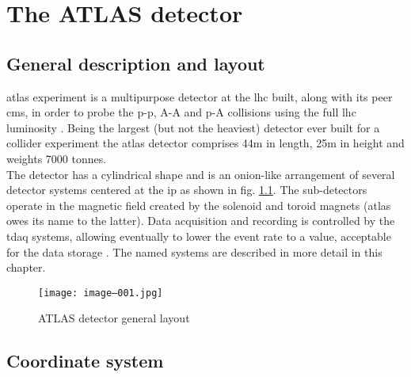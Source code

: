 \chapter{The ATLAS detector}
    
   
        
    \section{General description and layout}
    
        \gls{atlas} experiment is a multipurpose detector at the \gls{lhc} built, along with its peer \gls{cms}, in order to probe the p-p, A-A and p-A collisions using the full \gls{lhc} luminosity \cite{atlas_experiment}. Being the largest (but not the heaviest) detector ever built for a collider experiment the \gls{atlas} detector comprises 44m in length, 25m in height and weights 7000 tonnes. \\
        The detector has a cylindrical shape and is an onion-like arrangement of several detector systems centered at the \gls{ip} as shown in fig. \ref{fig::atlas_layout}. The sub-detectors operate in the magnetic field created by the solenoid and toroid magnets (\gls{atlas} owes its name to the latter). Data acquisition and recording is controlled by the \gls{tdaq} systems, allowing eventually to lower the event rate to a value, acceptable for the data storage \cite{atlas_trigger}. The named systems are described in more detail in this chapter.
        
        
        \begin{figure}[htpb]
        		\texttt{[image: image--001.jpg]}
        		\caption{ ATLAS detector general layout}
        		\label{fig::atlas_layout}
        \end{figure}
        
        \section{Coordinate system}
        
